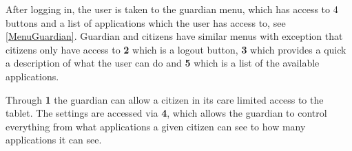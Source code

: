 
After logging in, the user is taken to the guardian menu, which has access to 4
buttons and a list of applications which the user has access to,
see \autoref{MenuGuardian}. Guardian and citizens have similar menus with
exception that citizens only have access to \textbf{2} which is a logout button,
\textbf{3} which provides a quick a description of what the user can do and
\textbf{5} which is a list of the available applications.


Through \textbf{1} the guardian can allow a citizen in its care limited access
to the tablet. The settings are accessed via \textbf{4}, which allows the
guardian to control everything from what applications a given citizen can see to
how many applications it can see.


% 
% 
% 
% 
% 

